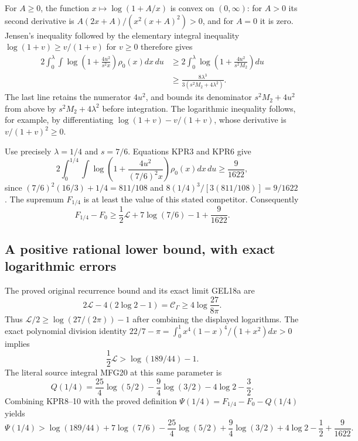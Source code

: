 For $A\geq0$, the function $x\mapsto\log(1+A/x)$ is convex
on $(0,\infty)$: for $A>0$ its second derivative is
$A(2x+A)/(x^2(x+A)^2)>0$, and for $A=0$ it is zero.
Jensen's inequality followed by the elementary integral inequality
$\log(1+v)\geq v/(1+v)$ for $v\geq0$ therefore gives
\[
 \begin{split}
 2\int_0^\lambda\int\log\left(1+\frac{4u^2}{s^2x}\right)
                      \rho_0(x)dx\,du
 &\geq2\int_0^\lambda\log\left(1+\frac{4u^2}{s^2M_2}\right)du\\
 &\geq\frac{8\lambda^3}{3(s^2M_2+4\lambda^2)}.
 \end{split}
 \tag{KPR6}
\]
The last line retains the numerator $4u^2$, and bounds its denominator
$s^2M_2+4u^2$ from above by $s^2M_2+4\lambda^2$ before integration.
The logarithmic inequality follows, for example, by differentiating
$\log(1+v)-v/(1+v)$, whose derivative is $v/(1+v)^2\geq0$.

Use precisely $\lambda=1/4$ and $s=7/6$. Equations KPR3 and KPR6 give
\[
 2\int_0^{1/4}\int\log\left(1+\frac{4u^2}{(7/6)^2x}\right)
                          \rho_0(x)dx\,du
 \geq\frac{9}{1622},
 \tag{KPR7}
\]
since $(7/6)^2(16/3)+1/4=811/108$ and
$8(1/4)^3/[3(811/108)]=9/1622$.
The supremum $F_{1/4}$ is at least the value of this stated competitor.
Consequently
\[
 F_{1/4}-F_0
 \geq\frac12\mathcal L+7\log(7/6)-1+\frac9{1622}.
 \tag{KPR8}
\]

\subsection{A positive rational lower bound, with exact logarithmic errors}
The proved original recurrence bound and its exact limit GEL18a are
\[
 2\mathcal L-4(2\log2-1)=\mathcal C_\Gamma
      \geq4\log\frac{27}{8\pi}.
\]
Thus
$\mathcal L/2\geq\log(27/(2\pi))-1$
after combining the displayed logarithms. The exact polynomial
division identity
$22/7-\pi=\int_0^1x^4(1-x)^4/(1+x^2)dx>0$ implies
\[
 \frac12\mathcal L>\log(189/44)-1.
 \tag{KPR9}
\]
The literal source integral MFG20 at this same parameter is
\[
 Q(1/4)=\frac{25}{4}\log(5/2)-\frac94\log(3/2)
                      -4\log2-\frac32.
 \tag{KPR10}
\]
Combining KPR8--10 with the proved definition
$\Psi(1/4)=F_{1/4}-F_0-Q(1/4)$ yields
\[
 \Psi(1/4)>
 \log(189/44)+7\log(7/6)-\frac{25}{4}\log(5/2)
       +\frac94\log(3/2)+4\log2-\frac12+\frac9{1622}.
 \tag{KPR11}
\]

